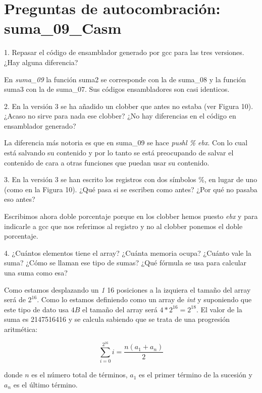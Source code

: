\section*{Preguntas de autocombración: suma\_09\_Casm}

\begin{ejercicio}{1. Repasar el código de ensamblador generado por gcc
    para las tres versiones. ¿Hay alguna diferencia?}

  En \textit{suma\_09} la función suma2 se corresponde con la de suma\_08
  y la función suma3 con la de suma\_07. Sus códigos ensambladores son
  casi identicos. 
  
\end{ejercicio}

\begin{ejercicio}{2. En la versión 3 se ha añadido un clobber que antes
    no estaba (ver Figura 10). ¿Acaso no sirve para nada ese clobber?
    ¿No hay diferencias en el código en ensamblador generado?}

  La diferencia más notoria es que en suma\_09 se hace \textit{pushl
    \% ebx}. Con lo cual está salvando su contenido y por lo tanto se
  está preocupando de salvar el contenido de cara a otras funciones
  que puedan usar su contenido.
  
\end{ejercicio}

\begin{ejercicio}{3. En la versión 3 se han escrito los registros
    con dos símbolos \%, en lugar de uno (como en la Figura 10).
    ¿Qué pasa si se escriben como antes? ¿Por qué no pasaba eso
    antes?}

  Escribimos ahora doble porcentaje porque en los clobber hemos puesto
  \textit{ebx} y para indicarle a gcc que nos referimos al registro y
  no al clobber ponemos el doble porcentaje.
  
\end{ejercicio}

\begin{ejercicio}{4. ¿Cuántos elementos tiene el array? ¿Cuánta memoria
    ocupa? ¿Cuánto vale la suma? ¿Cómo se llaman ese tipo de sumas?
    ¿Qué fórmula se usa para calcular una suma como esa?}

  Como estamos desplazando un \textit{1} 16 posiciones a la izquiera
  el tamaño del array será de $2^{16}$. Como lo estamos definiendo
  como un array de \textit{int} y suponiendo que este tipo de dato usa
  $4B$ el tamaño del array será $4*2^{16} = 2^{18}$. El valor de la suma es 2147516416 y se calcula sabiendo que se trata de una progresión aritmética:

  $$\sum_{i=0}^{2^{16}}i = \frac{n(a_1 + a_n)}{2}$$

  donde $n$ es el número total de términos, $a_1$ es el primer término
  de la sucesión y $a_n$ es el último término.
  
\end{ejercicio}


